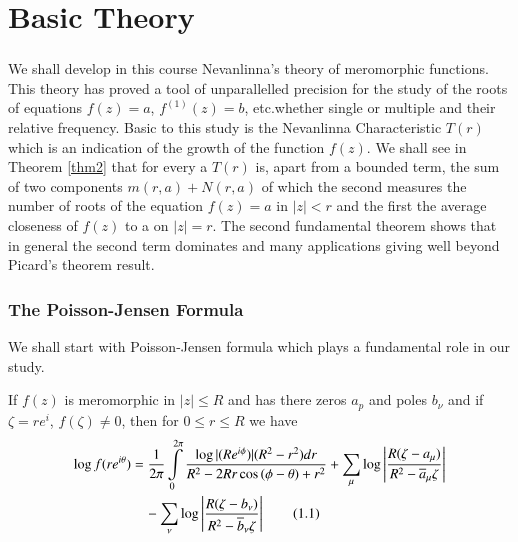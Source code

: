 \chapter{Basic Theory}

\setcounter{section}{1}
\setcounter{subsection}{0}
\subsection{}\label{part1-sec1.1} \pageoriginale

We shall develop in this course Nevanlinna's theory of meromorphic
functions. This theory has proved a tool of unparallelled precision
for the study of the roots of equations $f(z)=a$, $f^{(1)}(z)=b$,
etc.\@ whether single or multiple and their relative frequency. Basic
to this study is the Nevanlinna Characteristic $T(r)$ which is an
indication of the growth of the function $f(z)$. We shall see in
Theorem \ref{thm2} that for every a $T(r)$ is, apart from a bounded
term, the sum of two components $m(r,a)+N(r,a)$ of which the second
measures the number of roots of the equation $f(z)=a$ in $|z|<r$ and
the first the average closeness of $f(z)$ to a on $|z|=r$. The second
fundamental theorem shows that in general the second term dominates
and many applications giving well beyond Picard's theorem result.

\subsection{The Poisson-Jensen Formula}

We shall start with Poisson-Jensen formula which plays a fundamental
role in our study.

\begin{thm}\label{thm1}
If $f(z)$ is meromorphic in $|z|\leq R$ and has there zeros $a_{p}$
and poles $b_{\nu}$ and if $\zeta=re^{i}$, $f(\zeta)\neq 0$, then for
$0\leq r\leq R$ we have
\begin{align*}
\log f(re^{i\theta}) &=
\frac{1}{2\pi}\int\limits^{2\pi}_{0}
\frac{\log|(Re^{i\phi})|(R^{2}-r^{2})dr}{R^{2}-2Rr\cos \,(\phi-\theta) +
  r^{2}} + \sum_{\mu}\log\left|
\frac{R(\zeta-a_{\mu})}{R^{2}-\overline{a}_{\mu}\zeta}\right|\\ 
& \quad - \sum_{\nu}\log\left |
\frac{R(\zeta-b_{\nu})}{R^{2}-\overline{b}_{\nu}\zeta}
\right|\tag{1.1}\label{part-eq1.1} 
\end{align*}
\end{thm}

